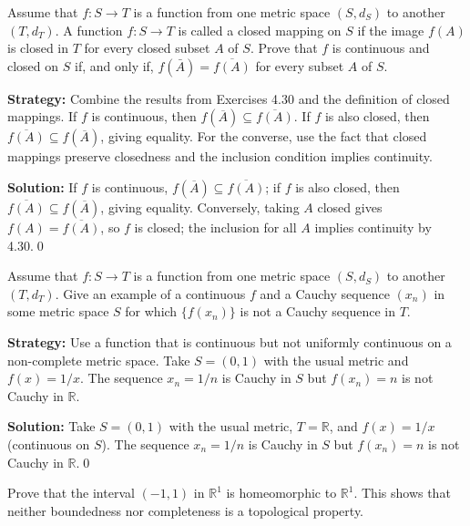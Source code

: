 \begin{problembox}
Assume that $f : S \rightarrow T$ is a function from one metric space $(S, d_S)$ to another $(T, d_T)$. A function $f : S \rightarrow T$ is called a closed mapping on $S$ if the image $f(A)$ is closed in $T$ for every closed subset $A$ of $S$. Prove that $f$ is continuous and closed on $S$ if, and only if, $f(\bar{A}) = \overline{f(A)}$ for every subset $A$ of $S$.
\end{problembox}

\noindent\textbf{Strategy:} Combine the results from Exercises 4.30 and the definition of closed mappings. If $f$ is continuous, then $f(\overline{A}) \subseteq \overline{f(A)}$. If $f$ is also closed, then $\overline{f(A)} \subseteq f(\overline{A})$, giving equality. For the converse, use the fact that closed mappings preserve closedness and the inclusion condition implies continuity.

\bigskip\noindent\textbf{Solution:}
If $f$ is continuous, $f(\overline{A})\subseteq\overline{f(A)}$; if $f$ is also closed, then $\overline{f(A)}\subseteq f(\overline{A})$, giving equality. Conversely, taking $A$ closed gives $f(A)=\overline{f(A)}$, so $f$ is closed; the inclusion for all $A$ implies continuity by 4.30.\qed



\begin{problembox}
Assume that $f : S \rightarrow T$ is a function from one metric space $(S, d_S)$ to another $(T, d_T)$. Give an example of a continuous $f$ and a Cauchy sequence $(x_n)$ in some metric space $S$ for which $\{f(x_n)\}$ is not a Cauchy sequence in $T$.
\end{problembox}

\noindent\textbf{Strategy:} Use a function that is continuous but not uniformly continuous on a non-complete metric space. Take $S = (0,1)$ with the usual metric and $f(x) = 1/x$. The sequence $x_n = 1/n$ is Cauchy in $S$ but $f(x_n) = n$ is not Cauchy in $\mathbb{R}$.

\bigskip\noindent\textbf{Solution:}
Take $S=(0,1)$ with the usual metric, $T=\mathbb{R}$, and $f(x)=1/x$ (continuous on $S$). The sequence $x_n=1/n$ is Cauchy in $S$ but $f(x_n)=n$ is not Cauchy in $\mathbb{R}$.\qed



\begin{problembox}
Prove that the interval $(-1, 1)$ in $\mathbb{R}^1$ is homeomorphic to $\mathbb{R}^1$. This shows that neither boundedness nor completeness is a topological property.
\end{problembox}

